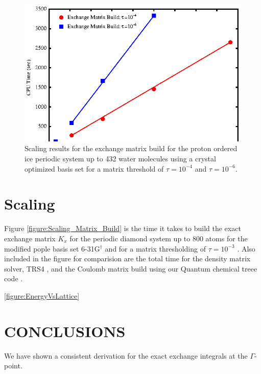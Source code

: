 \documentclass[prb,aps,nobibnotes,twocolumn,doublespace,twocolumngrid,superbib]{revtex4}
\begin{document}
%
\begin{figure}
\caption{Scaling results for the exchange matrix
build  for the proton ordered ice periodic system up to 432 water molecules 
using a crystal optimized basis set\cite{CBS:511G:H,CBS:861G:MgO} for a matrix threshold of 
$\tau=10^{-4}$ and  $\tau=10^{-6}$.}
\label{figure:Scaling_Matrix_Build_Ice}
{\centering \includegraphics{Timing_pIce_ONX_2.ps} \par} 
\end{figure}


\section{Scaling}
 
Figure \ref{figure:Scaling_Matrix_Build} is the time it takes to build the
exact exchange matrix  \( K_{x} \) for the periodic diamond system up to 800 atoms for the modified pople 
basis set 6-31G$ ^\dagger$ \cite{Pople92} and for a matrix thresholding of $\tau=10^{-3}$ .
Also included in the figure for comparision are the total time for the
density matrix solver, TRS4 \cite{ANiklasson03}, 
and the Coulomb matrix build using our Quantum chemical treee code \cite{CTymczak03c}. 


\ref{figure:EnergyVsLattice}


\section{CONCLUSIONS}
We have shown a consistent derivation for the exact exchange integrals at the $\Gamma$-point. 
\end{document}
